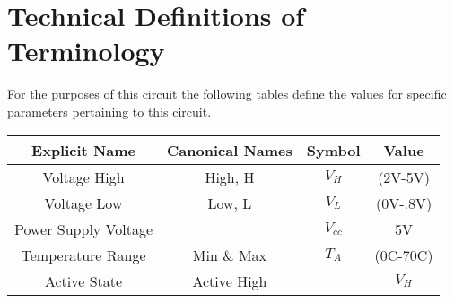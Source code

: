 \section{Technical Definitions of Terminology}
For the purposes of this circuit the following tables define
the values for specific parameters pertaining to this circuit.\\


\begin{tabular}{|c|c|c|c|} \hline
\textbf{Explicit Name} & \textbf{Canonical Names} & \textbf{Symbol} 
& \textbf{Value}\\ \hline
Voltage High & High, H & $V_{H}$ & (2V-5V) \\ \hline
Voltage Low & Low, L & $V_{L}$ & (0V-.8V) \\ \hline
Power Supply Voltage & & $V_{cc}$ & 5V \\ \hline
Temperature Range & Min \& Max & $T_{A}$ & (0C-70C) \\ \hline
Active State & Active High &  & $V_{H}$ \\ \hline %
\end{tabular}
